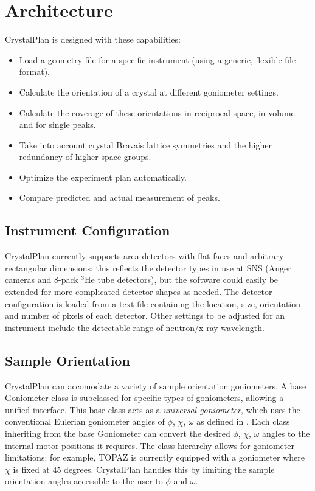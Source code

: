 \documentclass[final]{iucr}              %
\begin{document}
\section{Architecture}

CrystalPlan is designed with these capabilities:

\begin{itemize}
  \item Load a geometry file for a specific instrument (using a generic,
  flexible file format).
  \item Calculate the orientation of a crystal at different goniometer settings.
  \item Calculate the coverage of these orientations in reciprocal space,
  in volume and for single peaks.
  \item Take into account crystal Bravais lattice symmetries and the higher
  redundancy of higher space groups.
  \item Optimize the experiment plan automatically.
  \item Compare predicted and actual measurement of peaks.
\end{itemize}

\subsection{Instrument Configuration}

CrystalPlan currently supports area detectors with flat faces and arbitrary
rectangular dimensions; this reflects the detector types in use at SNS (Anger
cameras and 8-pack $^3$He tube detectors), but the software could easily be
extended for more complicated detector shapes as needed. The detector configuration is loaded from
a text file containing the location, size, orientation and number of pixels of
each detector. Other settings to be adjusted for an instrument include the
detectable range of neutron/x-ray wavelength.


\subsection{Sample Orientation}

CrystalPlan can accomodate a variety of sample
orientation goniometers. A base Goniometer class is subclassed for specific types of
goniometers, allowing a unified interface. This base class acts as a
\emph{universal goniometer},
which uses the conventional Eulerian goniometer angles of
$\phi$, $\chi$, $\omega$ as defined in \cite{busing67}.
Each class inheriting from the base Goniometer can convert
the desired $\phi$, $\chi$, $\omega$ angles to the internal motor positions it requires. 
The class hierarchy allows for goniometer limitations: for example, TOPAZ is
currently equipped with a goniometer where $\chi$ is fixed at 45 degrees.
CrystalPlan handles this by limiting the sample orientation angles accessible to the user to $\phi$ and
$\omega$.
    
\end{document}
